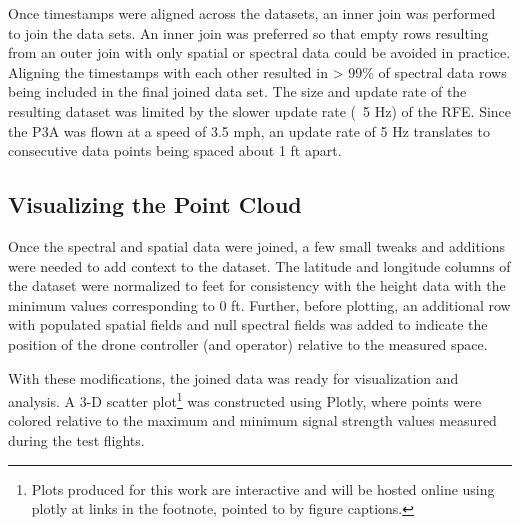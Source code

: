\documentclass[pageno]{jpaper}
\begin{document}
Once timestamps were aligned across the datasets, an inner join was performed to join the data sets. An inner join was preferred so that empty rows resulting from an outer join with only spatial or spectral data could be avoided in practice. Aligning the timestamps with each other resulted in > 99\% of spectral data rows being included in the final joined data set. The size and update rate of the resulting dataset was limited by the slower update rate (~5 Hz) of the RFE. Since the P3A was flown at a speed of 3.5 mph, an update rate of 5 Hz translates to consecutive data points being spaced about 1 ft apart. 

\subsection{Visualizing the Point Cloud}
Once the spectral and spatial data were joined, a few small tweaks and additions were needed to add context to the dataset. The latitude and longitude columns of the dataset were normalized to feet for consistency with the height data with the minimum values corresponding to 0 ft. Further, before plotting, an additional row with populated spatial fields and null spectral fields was added to indicate the position of the drone controller (and operator) relative to the measured space. 

With these modifications, the joined data was ready for visualization and analysis. A 3-D scatter plot\footnote{Plots produced for this work are interactive and will be hosted online using plotly at links in the footnote, pointed to by figure captions.} was constructed using Plotly, where points were colored relative to the maximum and minimum signal strength values measured during the test flights. 
\end{document}

